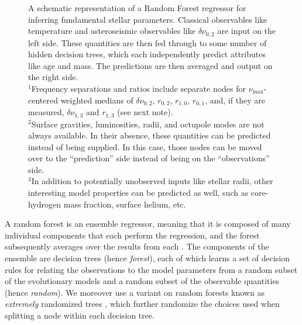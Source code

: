 \documentclass[manuscript]{aastex}
\begin{document}
\begin{figure}
    \centering
    
    \caption{A schematic representation of a Random Forest regressor for inferring fundamental stellar parameters. Classical observables like temperature and asteroseismic observables like $\delta\nu_{0,2}$ are input on the left side. These quantities are then fed through to some number of hidden decision trees, which each independently predict attributes like age and mass. The predictions are then averaged and output on the right side. \\
    $^1$Frequency separations and ratios include separate nodes for $\nu_{\max}$-centered weighted medians of $\delta\nu_{0,2}$, $r_{0,2}$, $r_{1,0}$, $r_{0,1}$, and, if they are measured, $\delta\nu_{1,3}$ and $r_{1,3}$ (see next note). \\
    $^2$Surface gravities, luminosities, radii, and octupole modes are not always available. In their absence, these quantities can be predicted instead of being supplied. In this case, those nodes can be moved over to the ``prediction'' side instead of being on the ``observations'' side. \\
    $^3$In addition to potentially unobserved inputs like stellar radii, other interesting model properties can be predicted as well, such as core-hydrogen mass fraction, surface helium, etc. }
    \label{fig:rf}
\end{figure}

A random forest is an ensemble regressor, meaning that it is composed of many individual components that each perform the regression, and the forest subsequently averages over the results from each \citep{breiman2001random}. The components of the ensemble are decision trees (hence \emph{forest}), each of which learns a set of decision rules for relating the observations to the model parameters from a random subset of the evolutionary models and a random subset of the observable quantities (hence \emph{random}). We moreover use a variant on random forests known as \emph{extremely} randomized trees \citep{geurts2006extremely}, which further randomize the choices used when splitting a node within each decision tree. %
\end{document}
